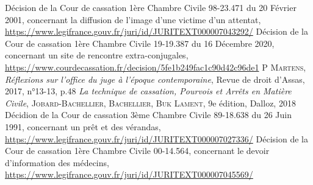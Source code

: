 \documentclass[math]{cours}
\begin{document}
\begin{thebibliography}{255}
	Décision de la Cour de cassation 1ère Chambre Civile 98-23.471 du 20 Février 2001, concernant la diffusion de l'image d'une victime d'un attentat,\\
	\url{https://www.legifrance.gouv.fr/juri/id/JURITEXT000007043292/}
	Décision de la Cour de cassation 1ère Chambre Civile 19-19.387 du 16 Décembre 2020, concernant un site de rencontre extra-conjugales,\\
	\url{https://www.courdecassation.fr/decision/5fe1b249fac1c90d42c96de1}
		P \textsc{Martens}, \textit{Réflexions sur l'office du juge à l'époque contemporaine},
		Revue de droit d'Assas, 2017, n°13-13, p.48
		\textit{La technique de cassation, \small{Pourvois et Arrêts en Matière Civile}}, \textsc{Jobard-Bachellier, Bachellier, Buk Lament}, 9e édition, Dalloz, 2018
		Décidion de la Cour de cassation 3ème Chambre Civile 89-18.638 du 26 Juin 1991, concernant un prêt et des vérandas,\\
		\url{https://www.legifrance.gouv.fr/juri/id/JURITEXT000007027336/}
		Décision de la Cour de cassation 1ère Chambre Civile 00-14.564, concernant le devoir d'information des médecins,\\
		\url{https://www.legifrance.gouv.fr/juri/id/JURITEXT000007045569/}
\end{thebibliography}


\end{document}
